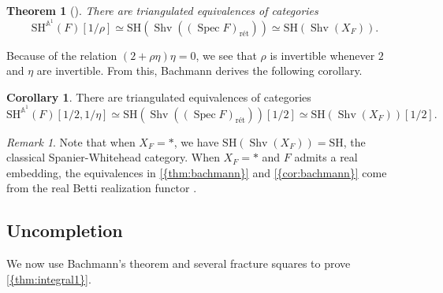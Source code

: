 \documentclass[10pt]{amsart}
\numberwithin{equation}{section}
\theoremstyle{plain}
\newtheorem{theorem}[theorem]{Theorem}
\theoremstyle{definition}
\newtheorem{corollary}[corollary]{Corollary}
\theoremstyle{remark}
\newtheorem{remark}[remark]{Remark}
\begin{document}
\begin{theorem}[{\cite[Theorem 31]{bachmann:rho}}]\label{thm:bachmann}
There are triangulated equivalences of categories
\[
  {\mathrm{SH}^{{\mathbb{A}}^1}\!}(F)[1/\rho]\simeq {\mathrm{SH}}({\operatorname{Shv}}(({\operatorname{Spec}} F)_{\text{r\'et}}))\simeq {\mathrm{SH}}({\operatorname{Shv}}(X_F)).
\]
\end{theorem}

Because of the relation $(2+\rho\eta)\eta = 0$, we see that $\rho$ is invertible whenever $2$ and $\eta$ are invertible.  From this, Bachmann derives the following corollary.

\begin{corollary}\label{cor:bachmann}
There are triangulated equivalences of categories
\[
  {\mathrm{SH}^{{\mathbb{A}}^1}\!}(F)[1/2,1/\eta] \simeq {\mathrm{SH}}({\operatorname{Shv}}(({\operatorname{Spec}} F)_{\text{r\'et}}))[1/2]\simeq {\mathrm{SH}}({\operatorname{Shv}}(X_F))[1/2].
\]
\end{corollary}

\begin{remark}
Note that when $X_F = *$, we have ${\mathrm{SH}}({\operatorname{Shv}}(X_F)) = {\mathrm{SH}}$, the classical Spanier-Whitehead category.  When $X_F=*$ and $F$ admits a real embedding, the equivalences in {\autoref{{thm:bachmann}}} and {\autoref{{cor:bachmann}}} come from the real Betti realization functor \cite[\S 9]{bachmann:rho}.
\end{remark}

\subsection{Uncompletion}\label{subsec:integral1}

We now use Bachmann's theorem and several fracture squares to prove {\autoref{{thm:integral1}}}.
\end{document}
